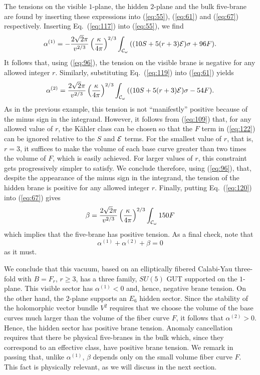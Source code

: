 \documentclass[a4paper,12pt]{article}
\numberwithin{equation}{section}
\theoremstyle{plain}
\begin{document}
The tensions on the visible $1$-plane, the hidden $2$-plane and the bulk
five-brane are found by inserting these expressions into (\ref{eq:55}),
(\ref{eq:61}) and (\ref{eq:67}) respectively. Inserting Eq.~(\ref{eq:117})
into (\ref{eq:55}), we find 
%
\begin{equation}
\alpha^{(1)}=-\frac{2\sqrt{2}\pi}{v^{2/3}}\left(\frac{\kappa}{4\pi}\right)^{2/3}
\int_{{\cal{C}}_{\omega}}{((10S+5(r+3){\cal{E}})\sigma+96F)}.
\label{eq:121}
\end{equation}
%
It follows that, using (\ref{eq:96}), the tension on the visible brane is
negative for any allowed integer $r$. Similarly, substituting Eq.~(\ref{eq:119}) into (\ref{eq:61}) yields
%
\begin{equation}
\alpha^{(2)}=\frac{2\sqrt{2}\pi}{v^{2/3}}\left(\frac{\kappa}{4\pi}\right)^{2/3}
\int_{{\cal{C}}_{\omega}}{((10S+5(r+3){\cal{E}})\sigma-54F)}.
\label{eq:122}
\end{equation}
%
As in the previous example, this tension is not ``manifestly'' positive
because of the minus sign in the integrand. However, it follows from
(\ref{eq:109}) that, for any allowed value of $r$, the K\"{a}hler class can be chosen
so that the $F$ term in (\ref{eq:122}) can be ignored relative to the
$S$ and ${\cal{E}}$ terms. For the smallest value of $r$, that is, $r=3$, it
suffices to make the volume of each base curve greater than two times the
volume of $F$, which is easily achieved. For larger values of $r$, this
constraint gets progressively simpler to satisfy. We conclude therefore, using
(\ref{eq:96}), that, despite the appearance of the minus sign in the
integrand, the tension of the hidden brane is positive for any allowed integer
$r$. Finally, putting Eq.~(\ref{eq:120}) into (\ref{eq:67}) gives
%
\begin{equation}
\beta=\frac{2\sqrt{2}\pi}{v^{2/3}}\left(\frac{\kappa}{4\pi}\right)^{2/3}
\int_{{\cal{C}}_{\omega}}{150F}
\label{eq:123}
\end{equation}
%
which implies that the five-brane has positive tension. As a final check, note
that
%
\begin{equation}
\alpha^{(1)}+\alpha^{(2)}+\beta=0
\label{eq:124}
\end{equation}
%
as it must.

We conclude that this vacuum, based on an elliptically fibered Calabi-Yau
three-fold with $B=F_{r}$, $r\geq3$, has a three family, $SU(5)$ GUT supported
on the $1$-plane. This visible sector has $\alpha^{(1)}<0$ and, hence,
negative brane tension. On the other hand, the $2$-plane supports an $E_{6}$
hidden sector. Since the stability of the holomorphic vector bundle
$V^{2}$ requires that we choose the volume of the base curves much larger than
the volume of the fiber curve $F$, it follows that $\alpha^{(2)}>0$. Hence,
the hidden sector has positive brane tension. Anomaly cancellation requires
that there be physical five-branes in the bulk which, since they correspond to
an effective class, have positive brane tension. We remark in passing that,
unlike $\alpha^{(1)}$, $\beta$ depends only on the small volume fiber curve
$F$. This fact is physically relevant, as we will discuss in the next section.
\end{document}
